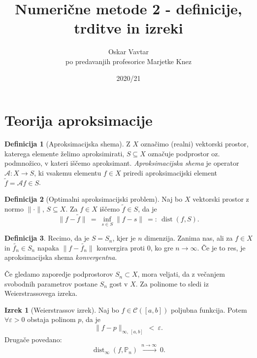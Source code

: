 \documentclass[11pt]{article}
\title{Numerične metode 2 - definicije, trditve in izreki}
\author{Oskar Vavtar \\
po predavanjih profesorice Marjetke Knez}
\date{2020/21}
\DeclareMathOperator{\dist}{dist}
\newcommand{\p}{\mathbb{P}}
\newcommand{\A}{\mathcal{A}}
\newcommand{\C}{\mathcal{C}}
\theoremstyle{definition}
\newtheorem{definicija}{Definicija}[section]
\theoremstyle{definition}
\newtheorem{izrek}{Izrek}[section]
\begin{document}
\maketitle
\pagebreak
\tableofcontents
\pagebreak


\section{Teorija aproksimacije}
\vspace{0.5cm}

\begin{definicija}[Aproksimacijska shema]

Z $X$ označimo (realni) vektorski prostor, katerega elemente želimo aproksimirati, $S \subseteq X$ označuje podprostor oz. podmnožico, v kateri iščemo aproksimant. \textit{Aproksimacijska shema} je operator $\A: X \rightarrow S$, ki vsakemu elementu $f \in X$ priredi aproksimacijski element $\tilde{f} = \A f \in S$.

\end{definicija}
\vspace{0.5cm}

\begin{definicija}[Optimalni aproksimacijski problem]

Naj bo $X$ vektorski prostor z normo $\|\cdot\|$, $S \subseteq X$. Za $f \in X$ iščemo $\tilde{f} \in S$, da je 
$$\|f - \tilde{f}\| ~=~ \inf_{s \in S}{\|f - s\|} ~=:~ \dist(f, S).$$

\end{definicija}
\vspace{0.5cm}

\begin{definicija}

Recimo, da je $S = S_n$, kjer je $n$ dimenzija. Zanima nas, ali za $f \in X$ in $\tilde{f_n} \in S_n$ napaka $\|f - \tilde{f_n}\|$ konvergira proti $0$, ko gre $n \rightarrow \infty$. Če je to res, je aproksimacijska shema \textit{konvergentna}.

Če gledamo zaporedje podprostorov $S_n \subset X$, mora veljati, da z večanjem svobodnih parametrov postane $S_n$ gost v $X$. Za polinome to sledi iz Weierstrassovega izreka.

\end{definicija}
\vspace{0.5cm}

\begin{izrek}[Weierstrassov izrek]

Naj bo $f \in \C([a, b])$ poljubna funkcija. Potem $\forall \varepsilon > 0$ obstaja polinom $p$, da je 
$$\|f - p\|_{\infty,~[a, b]} ~<~ \varepsilon.$$
Drugače povedano:
$$\dist_{\infty}(f, \p_n) ~\xrightarrow{n \rightarrow \infty}~ 0.$$

\end{izrek}
\vspace{0.5cm}
\end{document}

